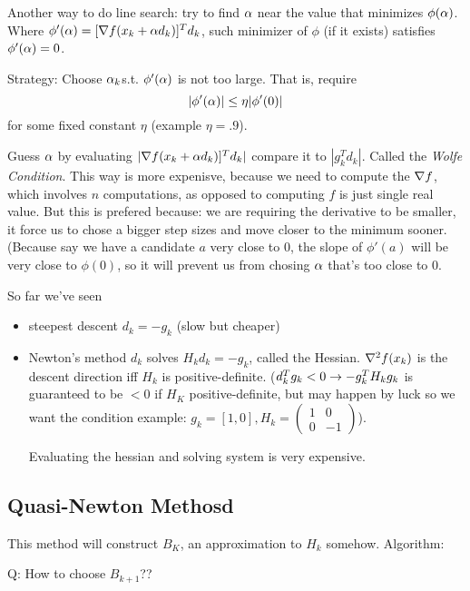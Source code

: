 Another way to do line search: try to find $\alpha$ near the value that
minimizes $\phi(\alpha)$.
Where $\phi'(\alpha) = [\nabla f (x_k+\alpha d_k)]^Td_k$, such minimizer of $\phi$ (if it
exists) satisfies $\phi'(\alpha) = 0$.

Strategy: Choose $\alpha_k$s.t. $\phi'(\alpha)$ is not too large. That is,
require $$|\phi'(\alpha)| \le \eta |\phi'(0)|$$ for some fixed constant
$\eta$ (example $\eta = .9$).

Guess $\alpha$ by evaluating $|\nabla f (x_k+\alpha d_k)]^Td_k|$ compare it
to $|g_k^Td_k|$. Called the \emph{Wolfe Condition}.
This way is more expenisve, because we need to compute the $\nabla f$,
which involves $n$ computations, as opposed to computing $f$ is just
single real value. 
But this is prefered because: we are requiring the derivative to be
smaller, it force us to chose a bigger step sizes and move closer to
the minimum sooner. (Because say we have a candidate $a$ very close to
$0$, the slope of $\phi'(a)$ will be very close to $\phi(0)$, so it
will prevent us from chosing $\alpha$ that's too close to 0.

So far we've seen
\begin{itemize}
\item steepest descent $d_k = -g_k$ (slow but cheaper)
\item Newton's method $d_k$ solves $H_kd_k = -g_k$, called the
  Hessian. $\nabla^2 f(x_k)$ is the descent direction iff $H_k$ is
  positive-definite. ($d_k^Tg_k < 0 \rightarrow -g_k^TH_kg_k$ is guaranteed to be $< 0$ if $H_K$
positive-definite, but may happen by luck so we want the condition
example: $g_k=[1,0], H_k=(\begin{smallmatrix}  1 & 0 \\ 0 & -1 \end{smallmatrix})$).

Evaluating the hessian and solving system is very expensive.
\end{itemize}

\subsection{Quasi-Newton Methosd}
\label{sec:quasi-newton}

This method will construct $B_K$, an approximation to $H_k$ somehow.
Algorithm:
\begin{algorithmic}
  \ENDFOR
\end{algorithmic}
Q: How to choose $B_{k+1}$??

